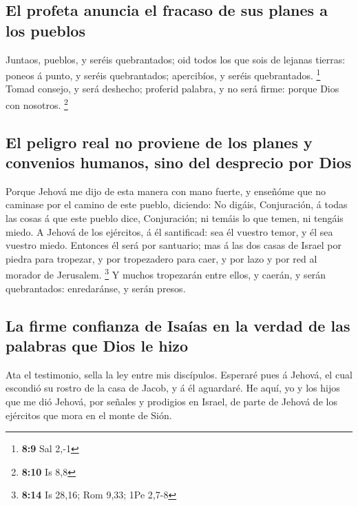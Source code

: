 \hypertarget{el-profeta-anuncia-el-fracaso-de-sus-planes-a-los-pueblos}{%
\subsection{El profeta anuncia el fracaso de sus planes a los
pueblos}\label{el-profeta-anuncia-el-fracaso-de-sus-planes-a-los-pueblos}}

 Juntaos, pueblos, y seréis quebrantados; oid todos los que
sois de lejanas tierras: poneos á punto, y seréis quebrantados;
apercibíos, y seréis quebrantados. \footnote{\textbf{8:9} Sal 2,-1}
 Tomad consejo, y será deshecho; proferid palabra, y no
será firme: porque Dios con nosotros. \footnote{\textbf{8:10} Is 8,8}

\hypertarget{el-peligro-real-no-proviene-de-los-planes-y-convenios-humanos-sino-del-desprecio-por-dios}{%
\subsection{El peligro real no proviene de los planes y convenios
humanos, sino del desprecio por
Dios}\label{el-peligro-real-no-proviene-de-los-planes-y-convenios-humanos-sino-del-desprecio-por-dios}}

 Porque Jehová me dijo de esta manera con mano fuerte, y
enseñóme que no caminase por el camino de este pueblo, diciendo:
 No digáis, Conjuración, á todas las cosas á que este
pueblo dice, Conjuración; ni temáis lo que temen, ni tengáis miedo.
 A Jehová de los ejércitos, á él santificad: sea él vuestro
temor, y él sea vuestro miedo.  Entonces él será por
santuario; mas á las dos casas de Israel por piedra para tropezar, y por
tropezadero para caer, y por lazo y por red al morador de Jerusalem.
\footnote{\textbf{8:14} Is 28,16; Rom 9,33; 1Pe 2,7-8}  Y
muchos tropezarán entre ellos, y caerán, y serán quebrantados:
enredaránse, y serán presos.

\hypertarget{la-firme-confianza-de-isauxedas-en-la-verdad-de-las-palabras-que-dios-le-hizo}{%
\subsection{La firme confianza de Isaías en la verdad de las palabras
que Dios le
hizo}\label{la-firme-confianza-de-isauxedas-en-la-verdad-de-las-palabras-que-dios-le-hizo}}

 Ata el testimonio, sella la ley entre mis discípulos.
 Esperaré pues á Jehová, el cual escondió su rostro de la
casa de Jacob, y á él aguardaré.  He aquí, yo y los hijos
que me dió Jehová, por señales y prodigios en Israel, de parte de Jehová
de los ejércitos que mora en el monte de Sión.

